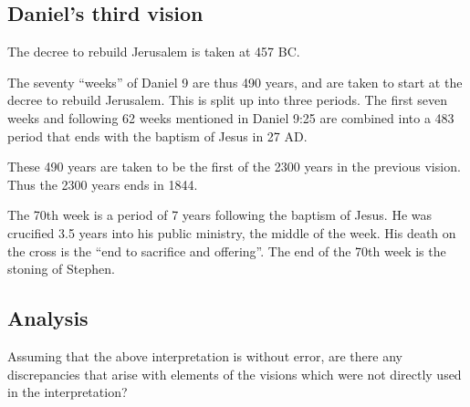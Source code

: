 \subsection{Daniel's third vision}

The decree to rebuild Jerusalem is taken at 457 BC.

The seventy ``weeks'' of Daniel 9 are thus 490 years, and are taken to start at the decree to rebuild Jerusalem.  This is split up into three periods.
The first seven weeks and following 62 weeks mentioned in Daniel 9:25 are combined into a 483 period that ends with the baptism of Jesus in 27 AD.

These 490 years are taken to be the first of the 2300 years in the previous vision.  Thus the 2300 years ends in 1844.

The 70th week is a period of 7 years following the baptism of Jesus.  He was crucified 3.5 years into his public ministry, the middle of the week.
His death on the cross is the ``end to sacrifice and offering''.  The end of the 70th week is the stoning of Stephen.

\subsection{Analysis}
Assuming that the above interpretation is without error, are there any discrepancies that arise with elements of the visions which were not
directly used in the interpretation?
